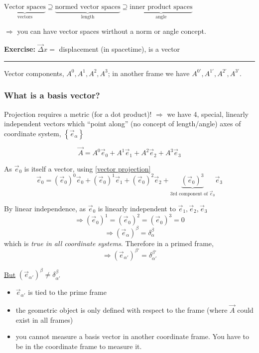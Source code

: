 \documentclass[a4paper]{article} %
\newcommand{\exercise}[2]
{
\begin{framed}
\textbf{Exercise:} #1 \\\hrule
#2
\end{framed}
}
\begin{document}
$\underbrace{\text{Vector spaces}}_{\text{vectors}}\supseteq \underbrace{\text{normed vector spaces}}_{\text{length}} \supseteq \underbrace{\text{inner product spaces}}_{\text{angle}}$

$\Rightarrow$ you can have vector spaces wirthout a norm or angle concept.

\exercise{$\vec{\Delta}x=$ displacement (in spacetime), is a vector}{}

Vector components, $A^0,A^1,A^2,A^3$; in another frame we have $A^{0'},A^{1'},A^{2'},A^{3'}$.

\subsubsection{What is a basis vector?}
Projection requires a metric (for a dot product)!
$\Rightarrow$ we have 4, special, linearly independent vectors which ``point along'' (no concept of length/angle) axes of coordinate system, $\left\{\vec{e}_{\alpha}\right\}$

\begin{equation}
\vec{A}=A^0 \vec{e}_{0} +A^{1}\vec{e}_{1}+A^{2}\vec{e}_{2}+A^{3}\vec{e}_{3} \label{vector projection}
\end{equation}

As $\vec{e}_{0}$ is itself a vector, using \ref{vector projection}
\begin{equation}
\vec{e}_{0}=(\vec{e}_{0})^{0}\vec{e}_{0}+(\vec{e}_{0})^{1}\vec{e}_{1}+(\vec{e}_{0})^{2}\vec{e}_{2}
+\underbrace{(\vec{e}_{0})^{3}}_{\text{3rd component of }\vec{e}_{0}}\vec{e}_{3}
\end{equation}

By linear independence, as $\vec{e}_0$ is linearly independent to $\vec{e}_{1},\vec{e}_{2},\vec{e}_{3}$
\begin{equation}
\Rightarrow (\vec{e}_{0})^{1}=(\vec{e}_{0})^{2}=(\vec{e}_{0})^{3}=0
\end{equation}
\begin{equation}
\Rightarrow (\vec{e}_{\alpha})^{\beta}=\delta_{\alpha}^{\beta}
\end{equation}
which is \emph{true in all coordinate systems}. Therefore in a primed frame,
\begin{equation}
\Rightarrow (\vec{e}_{\alpha'})^{\beta'}=\delta_{\alpha'}^{\beta'}
\end{equation}

\underline{But} $(\vec{e}_{\alpha'})^{\beta}\neq \delta^{\beta}_{\alpha'}$
\begin{itemize}
\item $\vec{e}_{\alpha'}$ is tied to the prime frame
\item the geometric object is only defined with respect to the frame (where $\vec{A}$ could exist in all frames)
\item you cannot measure a basis vector in another coordinate frame. You have to be in the coordinate frame to measure it.
\end{itemize}
\end{document}
